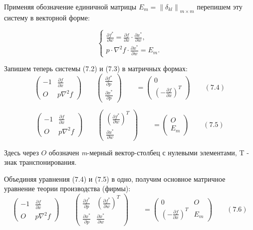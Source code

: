 \documentclass[12pt, 4paper]{book}
\begin{document}
{Применяя обозначение единичной матрицы $E_m = \left\|\delta_{kl}\right\|_{m \times m}$ перепишем эту систему в векторной форме: 
\begin{center}
$$\left\{
\begin{aligned}
\frac{\partial f^{*}}{\partial w}=\frac{\partial f}{\partial x}\cdot \frac{\partial x^{*}}{\partial w},\\
p \cdot \nabla^2 f \cdot \frac{\partial x^{*}}{\partial w}=E_m.
\end{aligned}
\right.$$
\end{center}
\par

Запишем теперь системы (7.2) и (7.3) в матричных формах: 
\[
\begin{pmatrix} -1 & \frac{\partial f}{\partial x} \\ O & p\nabla^2 f \end{pmatrix} \qquad 
\begin{pmatrix} \frac{\partial f^{*}}{\partial p}\\ \frac{\partial x^{*}}{\partial p} \end{pmatrix} \qquad =
\begin{pmatrix} 0 \\ (-\frac{\partial f}{\partial x})^{T} \end{pmatrix} \qquad (7.4)
\] 

\[
\begin{pmatrix} -1 & \frac{\partial f}{\partial x} \\ O & p\nabla^2 f \end{pmatrix} \qquad 
\begin{pmatrix} (\frac{\partial f^{*}}{\partial w})^{T} \\ \frac{\partial x^{*}}{\partial w} \end{pmatrix} \qquad =
\begin{pmatrix} O \\ E_m \end{pmatrix} \qquad (7.5)
\] 
\par

Здесь через $O$ обозначен \textit{m}-мерный вектор-столбец с нулевыми элементами, T - знак транспонирования. 
\par

Объединяя уравнения (7.4) и (7.5) в одно, получим основное матричное уравнение теории производства (фирмы): 
\[
\begin{pmatrix} -1 & \frac{\partial f}{\partial x} \\ O & p\nabla^2 f \end{pmatrix} \qquad 
\begin{pmatrix} \frac{\partial f^{*}}{\partial p} & (\frac{\partial f^{*}}{\partial w})^{T} \\ \frac{\partial x^{*}}{\partial p} & \frac{\partial x^{*}}{\partial w} \end{pmatrix} \qquad =
\begin{pmatrix} 0 & O\\ (-\frac{\partial f}{\partial x})^{T} & E_m \end{pmatrix} \qquad (7.6)
\] 
\par

}
\end{document}
